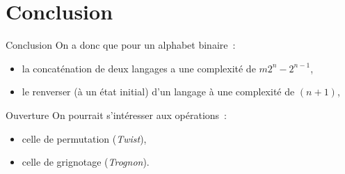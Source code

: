 
\section{Conclusion}


\begin{frame}{\myframetitle}
  \begin{block}{Conclusion}
    On a donc que pour un alphabet binaire~:
    \begin{itemize}
      \item la concaténation de deux langages a une complexité de
        \(m2^n - 2^{n - 1}\),
      \item le renverser (à un état initial) d'un langage à une complexité de
        \((n + 1)\),
    \end{itemize}
  \end{block}
\end{frame}

\begin{frame}{\myframetitle}
  \begin{block}{Ouverture}
    On pourrait s'intéresser aux opérations~:
    \begin{itemize}
      \item<2-> celle de permutation (\textit{Twist}),
      \item<3-> celle de grignotage (\textit{Trognon}).
    \end{itemize}
  \end{block}
\end{frame}